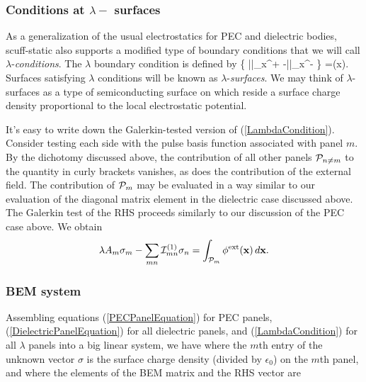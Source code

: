 \documentclass[letterpaper]{article}
\begin{document}
\subsubsection*{Conditions at $\lambda-$ surfaces}

As a generalization of the usual electrostatics
for PEC and dielectric bodies, {\sc scuff-static} 
also supports a modified type of boundary conditions
that we will call $\lambda$-\textit{conditions}.
The $\lambda$ boundary condition is defined by
{
  \lambda\bigg\{
    \left|\right|_{\vb x^+} 
   -\left|\right|_{\vb x^-} 
          \bigg\}
   =\phi(\vb x).
}
Surfaces satisfying $\lambda$ conditions will be 
known as $\lambda$-\textit{surfaces}. We may think 
of $\lambda$-surfaces as a type of semiconducting
surface on which reside a surface charge density
proportional to the local electrostatic potential.

It's easy to write down the Galerkin-tested version
of (\ref{LambdaCondition}). Consider testing each
side with the pulse basis function associated with
panel $m$. By the dichotomy discussed above, the 
contribution of all other panels $\mathcal{P}_{n\ne m}$ to 
the quantity in curly brackets vanishes, as does the 
contribution of the external field. The contribution
of $\mathcal{P}_m$ may be evaluated in a way similar
to our evaluation of the diagonal matrix element
in the dielectric case discussed above. The Galerkin
test of the RHS proceeds similarly to our discussion
of the PEC case above. We obtain
$$ \lambda A_m \sigma_m - \sum_{mn} \mathcal{I}_{mn}^{(1)} \sigma_{n}
   =\int_{\mathcal{P}_m} \phi^{\hbox{\scriptsize{ext}}}(\mathbf{x})\,d\mathbf{x}.
$$


\subsubsection*{BEM system}

Assembling equations (\ref{PECPanelEquation}) for PEC panels,
(\ref{DielectricPanelEquation}) for all dielectric panels,
and (\ref{LambdaCondition}) for all $\lambda$ panels 
into a big linear system, we have 
where the $m$th entry of the unknown vector $\sigma$ is the 
surface charge density (divided by $\epsilon_0$) on the $m$th
panel, and where the elements of the BEM matrix and the RHS vector are
\end{document}
